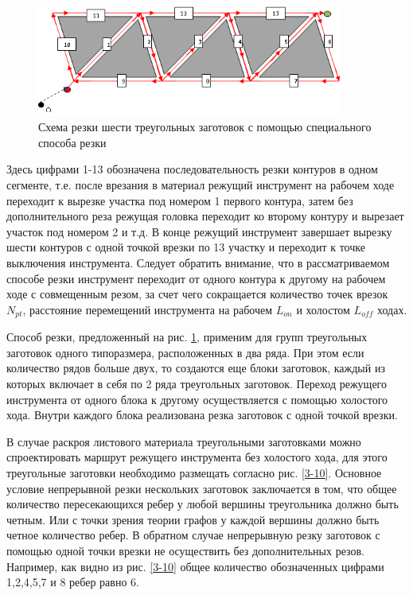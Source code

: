 \documentclass{article}
\begin{document}
\begin{figure}
  \begin{center}
  \includegraphics[width=0.9\textwidth]{6-1.png}
  \caption{Схема резки шести треугольных заготовок с помощью специального способа резки}
  \label{6-1}
  \end{center}
\end{figure}

Здесь цифрами 1-13 обозначена последовательность
резки контуров в одном сегменте,
т.е. после врезания в материал режущий инструмент
на рабочем ходе переходит к вырезке участка под номером 1
первого контура,
затем без дополнительного реза режущая головка
переходит ко второму контуру и вырезает участок под номером 2 и т.д.
В конце режущий инструмент завершает вырезку шести контуров
с одной точкой врезки по 13 участку и переходит к
точке выключения инструмента.
Следует обратить внимание, что в рассматриваемом способе
резки инструмент переходит от одного контура к другому
на рабочем ходе с совмещенным резом,
за счет чего сокращается количество точек врезок $N_{pt}$,
расстояние перемещений инструмента на рабочем $L_{on}$
и холостом  $L_{off}$ ходах.

Способ резки, предложенный на рис. \ref{6-1},
применим для групп треугольных заготовок одного типоразмера,
расположенных в два ряда.
При этом если количество рядов больше двух,
то создаются еще блоки заготовок,
каждый из которых включает в себя по 2 ряда треугольных заготовок.
Переход режущего инструмента от одного блока к другому
осуществляется с помощью холостого хода.
Внутри каждого блока реализована резка заготовок с одной точкой врезки.

В случае раскроя листового материала треугольными
заготовками можно спроектировать маршрут режущего
инструмента без холостого хода,
для этого треугольные заготовки необходимо
размещать согласно рис. \ref{3-10}.
Основное условие непрерывной резки нескольких
заготовок заключается в том,
что общее количество пересекающихся ребер у
любой вершины треугольника должно быть четным.
Или с точки зрения теории графов у каждой вершины
должно быть четное количество ребер.
В обратном случае непрерывную резку заготовок
с помощью одной точки врезки не осуществить
без дополнительных резов.
Например, как видно из рис. \ref{3-10}
общее количество обозначенных цифрами 1,2,4,5,7 и 8 ребер равно 6.
\end{document}
